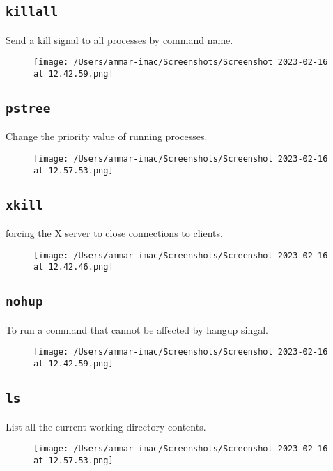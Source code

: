\documentclass{article}
\def\code#1{\texttt{#1}}
\begin{document}
\subsection{\code{killall}}%
Send a kill signal to all processes by command name.
\begin{figure}[ht]
  \centering
  \texttt{[image: /Users/ammar-imac/Screenshots/Screenshot 2023-02-16 at 12.42.59.png]}
\end{figure}

\subsection{\code{pstree}}%
Change the priority value of running processes.
\begin{figure}[ht]
  \centering
  \texttt{[image: /Users/ammar-imac/Screenshots/Screenshot 2023-02-16 at 12.57.53.png]}
\end{figure}


\newpage


\subsection{\code{xkill}}%
forcing the X server to close connections to clients.
\begin{figure}[ht]
  \centering
  \texttt{[image: /Users/ammar-imac/Screenshots/Screenshot 2023-02-16 at 12.42.46.png]}
\end{figure}

\subsection{\code{nohup}}%
To run a command that cannot be affected by hangup singal.
\begin{figure}[ht]
  \centering
  \texttt{[image: /Users/ammar-imac/Screenshots/Screenshot 2023-02-16 at 12.42.59.png]}
\end{figure}

\subsection{\code{ls}}%
List all the current working directory contents.
\begin{figure}[ht]
  \centering
  \texttt{[image: /Users/ammar-imac/Screenshots/Screenshot 2023-02-16 at 12.57.53.png]}
\end{figure}
\end{document}
